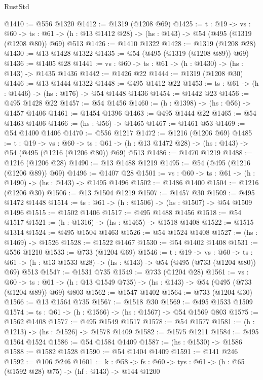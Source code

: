 \begin{lexlean}{RustStd}
\begin{coremodule}
{\begin{coremodule}
{{{{{@1410 := @556 @1320
@1412 := @1319 (@1208 @69)
@1425 := {t : @19} ->
  {vs : @60} ->
  {ts : @61} -> (h : @13 @1412 @28) -> (hs : @143) -> @54 (@495 (@1319 (@1208 @80)) @69) @513
@1426 := @1410 @1322
@1428 := @1319 (@1208 @28)
@1430 := @13 @1428 @1322
@1435 := @54 (@495 (@1319 (@1208 @89)) @69)
@1436 := @1405 @28
@1441 := {vs : @60} -> {ts : @61} -> (h : @1430) -> (hs : @143) -> @1435 @1436
@1442 := @1426 @22
@1444 := @1319 (@1208 @30)
@1446 := @13 @1444 @1322
@1448 := @495 @1412 @22
@1453 := {ts : @61} -> (h : @1446) -> (hs : @176) -> @54 @1448 @1436
@1454 := @1442 @23
@1456 := @495 @1428 @22
@1457 := @54 @1456
@1460 := (h : @1398) -> (hs : @56) -> @1457 @1406
@1461 := @1454 @1396
@1463 := @495 @1444 @22
@1465 := @54 @1463 @1406
@1466 := (hs : @56) -> @1465
@1467 := @1461 @53
@1469 := @54 @1400 @1406
@1470 := @556 @1217
@1472 := @1216 (@1206 @69)
@1485 := {t : @19} ->
  {vs : @60} ->
  {ts : @61} -> (h : @13 @1472 @28) -> (hs : @143) -> @54 (@495 (@1216 (@1206 @80)) @69) @513
@1486 := @1470 @1219
@1488 := @1216 (@1206 @28)
@1490 := @13 @1488 @1219
@1495 := @54 (@495 (@1216 (@1206 @89)) @69)
@1496 := @1407 @28
@1501 := {vs : @60} -> {ts : @61} -> (h : @1490) -> (hs : @143) -> @1495 @1496
@1502 := @1486 @1400
@1504 := @1216 (@1206 @30)
@1506 := @13 @1504 @1219
@1507 := @1457 @30
@1509 := @495 @1472 @1448
@1514 := {ts : @61} -> (h : @1506) -> (hs : @1507) -> @54 @1509 @1496
@1515 := @1502 @1406
@1517 := @495 @1488 @1456
@1518 := @54 @1517
@1521 := (h : @1316) -> (hs : @1465) -> @1518 @1408
@1522 := @1515 @1314
@1524 := @495 @1504 @1463
@1526 := @54 @1524 @1408
@1527 := (hs : @1469) -> @1526
@1528 := @1522 @1467
@1530 := @54 @1402 @1408
@1531 := @556 @1210
@1533 := @733 (@1204 @69)
@1546 := {t : @19} ->
  {vs : @60} ->
  {ts : @61} -> (h : @13 @1533 @28) -> (hs : @143) -> @54 (@495 (@733 (@1204 @80)) @69) @513
@1547 := @1531 @735
@1549 := @733 (@1204 @28)
@1561 := {vs : @60} ->
  {ts : @61} -> (h : @13 @1549 @735) -> (hs : @143) -> @54 (@495 (@733 (@1204 @89)) @69) @803
@1562 := @1547 @1402
@1564 := @733 (@1204 @30)
@1566 := @13 @1564 @735
@1567 := @1518 @30
@1569 := @495 @1533 @1509
@1574 := {ts : @61} -> (h : @1566) -> (hs : @1567) -> @54 @1569 @803
@1575 := @1562 @1408
@1577 := @495 @1549 @1517
@1578 := @54 @1577
@1581 := (h : @1213) -> (hs : @1526) -> @1578 @1409
@1582 := @1575 @1211
@1584 := @495 @1564 @1524
@1586 := @54 @1584 @1409
@1587 := (hs : @1530) -> @1586
@1588 := @1582 @1528
@1590 := @54 @1404 @1409
@1591 := @141 @246
@1592 := @106 @246
@1601 := {k : @58} ->
  {fs : @60} -> {tys : @61} -> (h : @65 (@1592 @28) @75) -> (hf : @143) -> @144 @1200
}}}}}
\end{coremodule}}
\end{coremodule}
\end{lexlean}
